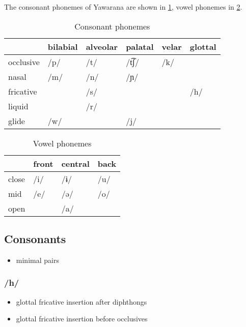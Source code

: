 \documentclass{memoir}
\begin{document}
The consonant phonemes of Yawarana are shown in \cref{tab:consonants},
vowel phonemes in \cref{tab:vowels}.

\begin{table}
\caption{Consonant phonemes}
\label{tab:consonants}
\centering
\begin{tabular}{llllll}
\toprule
          & bilabial & alveolar & palatal & velar & glottal \\
\midrule
occlusive &     /p/  &     /t/  &  /t͡ʃ/  &   /k/ &         \\
    nasal &     /m/  &     /n/  &    /ɲ/  &       &         \\
fricative &          &     /s/  &         &       &    /h/  \\
   liquid &          &     /r/  &         &       &         \\
    glide &     /w/  &          &     /j/ &       &         \\
\bottomrule
\end{tabular}

\end{table}

\begin{table}
\caption{Vowel phonemes}
\label{tab:vowels}
\centering
\begin{tabular}{llll}
\toprule
      & front & central & back \\
\midrule
close &  /i/  &    /ɨ/  & /u/  \\
  mid &  /e/  &    /ə/  & /o/  \\
 open &       &    /a/  &      \\
\bottomrule
\end{tabular}

\end{table}

\subsection{\texorpdfstring{Consonants
\label{sec:consonants}}{Consonants }}

\begin{itemize}
\tightlist
\item
  minimal pairs
\end{itemize}

\subsubsection{/h/}

\begin{itemize}
\tightlist
\item
  glottal fricative insertion after diphthongs
\item
  glottal fricative insertion before occlusives
\end{itemize}
\end{document}

